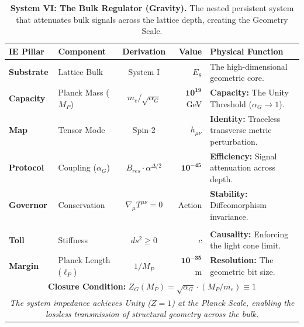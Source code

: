 \begin{table}[h]
\centering
\caption{\textbf{System VI: The Bulk Regulator (Gravity).} The nested persistent system that attenuates bulk signals across the lattice depth, creating the Geometry Scale.}
\label{tab:system_BulkRegulator}
\renewcommand{\arraystretch}{1.5}
\setlength{\tabcolsep}{6pt}
\begin{tabular}{@{} l l c r l @{}} 
\toprule
\textbf{IE Pillar} & \textbf{Component} & \textbf{Derivation} & \textbf{Value} & \textbf{Physical Function} \\
\midrule
\textbf{Substrate} & Lattice Bulk & System I & $E_8$ & The high-dimensional geometric core. \\
\midrule
\textbf{Capacity} & Planck Mass ($M_P$) & $m_e / \sqrt{\alpha_G}$ & $\mathbf{10^{19}}$ GeV & \textbf{Capacity:} The Unity Threshold ($\alpha_G \to 1$). \\
\textbf{Map} & Tensor Mode & Spin-2 & $h_{\mu\nu}$ & \textbf{Identity:} Traceless transverse metric perturbation. \\
\textbf{Protocol} & Coupling ($\alpha_G$) & $B_{res} \cdot \alpha^{\Delta/2}$ & $\mathbf{10^{-45}}$ & \textbf{Efficiency:} Signal attenuation across depth. \\
\textbf{Governor} & Conservation & $\nabla_\mu T^{\mu\nu}=0$ & Action & \textbf{Stability:} Diffeomorphism invariance. \\
\addlinespace
\multicolumn{5}{l}{\textit{The Thermodynamic Cost}} \\
\textbf{Toll} & Stiffness & $ds^2 \ge 0$ & $c$ & \textbf{Causality:} Enforcing the light cone limit. \\
\textbf{Margin} & Planck Length ($\ell_P$) & $1/M_P$ & $\mathbf{10^{-35}}$ m & \textbf{Resolution:} The geometric bit size. \\
\midrule
\multicolumn{5}{c}{\textbf{Closure Condition:} $Z_G(M_P) = \sqrt{\alpha_G} \cdot (M_P/m_e) \equiv 1$} \\
\multicolumn{5}{c}{\textit{The system impedance achieves Unity ($Z=1$) at the Planck Scale, enabling the lossless transmission of structural geometry across the bulk.}} \\
\bottomrule
\end{tabular}
\end{table}

